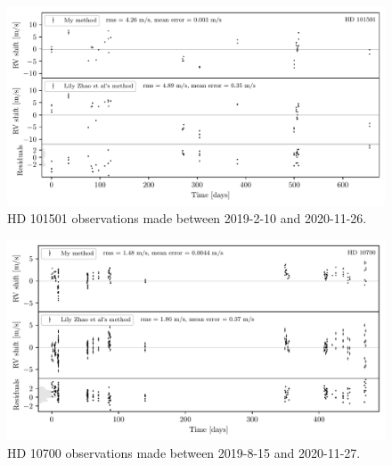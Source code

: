 \begin{figure}%
    \begin{wide}  
    \includegraphics[width=\textwidth]{figures/HD101501_barycentric_rv_vs_lily.pdf}
    \caption{HD 101501 observations made between 2019-2-10 and 2020-11-26.}
    \label{fig:HD101501_rvs}
\end{wide}
\end{figure}

\vspace{-0.75cm}

\begin{figure}%
    \begin{wide}  
    \includegraphics[width=\textwidth]{figures/HD10700_barycentric_rv_vs_lily.pdf}
    \caption{HD 10700 observations made between 2019-8-15 and 2020-11-27.}
    \label{fig:HD10700_rvs}
\end{wide}
\end{figure}

\vspace{-0.75cm}

